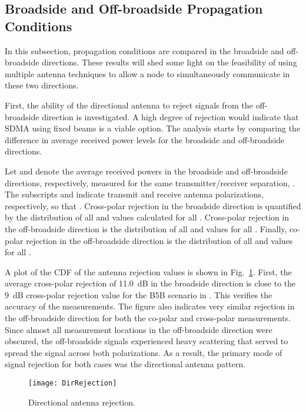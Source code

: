 \documentclass[12pt]{IEEEtran}
\begin{document}
\subsection{Broadside and Off-broadside Propagation Conditions}
\label{ssec:rejanalysis}

In this subsection, propagation conditions are compared in the broadside and off-broadside directions.  These results will shed some light on the feasibility of using multiple antenna techniques to allow a node to simultaneously communicate in these two directions.

First, the ability of the directional antenna to reject signals from the off-broadside direction is investigated.  A high degree of rejection would indicate that SDMA using fixed beams is a viable option.  The analysis starts by comparing the difference in average received power levels for the broadside and off-broadside directions.  

Let  and  denote the average received powers in the broadside and off-broadside directions, respectively, measured for the same transmitter/receiver separation, .  The subscripts  and  indicate transmit and receive antenna polarizations, respectively, so that .  Cross-polar rejection in the broadside direction is quantified by the distribution of all  and  values calculated for all . Cross-polar rejection in the off-broadside direction is the distribution of all  and  values for all .  Finally, co-polar rejection in the off-broadside direction is the distribution of all  and  values for all .

A plot of the CDF of the antenna rejection values is shown in Fig.~\ref{fg.reject}.  First, the average cross-polar rejection of 11.0~dB in the broadside direction is close to the 9~dB cross-polar rejection value for the B5B scenario in \cite{winner-2005}.  This verifies the accuracy of the measurements.  The figure also indicates very similar rejection in the off-broadside direction for both the co-polar and cross-polar measurements.  Since almost all measurement locations in the off-broadside direction were obscured, the off-broadside signals experienced heavy scattering that served to spread the signal across both polarizations.  As a result, the primary mode of signal rejection for both cases was the directional antenna pattern.

\begin{figure}[htbp]
\centerline{\texttt{[image: DirRejection]}}
\caption{Directional antenna rejection.}
\label{fg.reject}
\end{figure}
\end{document}
